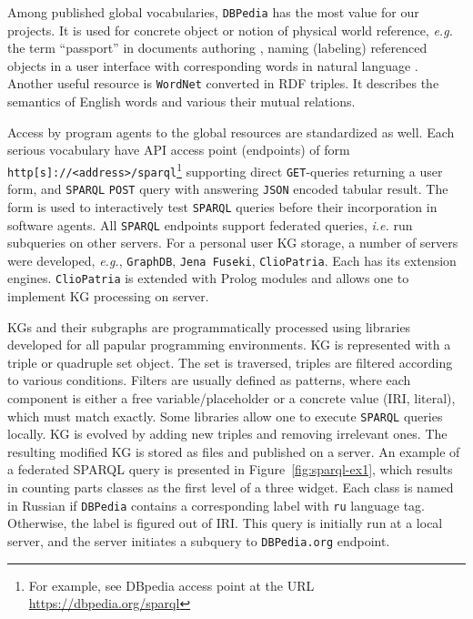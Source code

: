 \documentclass[
]{ceurart}
\begin{document}
Among published global vocabularies, \texttt{DBPedia} has the most value for our projects. It is used for concrete object or notion of physical world reference, \emph{e.g.} the term ``passport'' in documents authoring \cite{}, naming (labeling) referenced objects in a user interface with corresponding words in natural language \cite{github-db}. Another useful resource is \texttt{WordNet} converted in RDF triples.  It describes the semantics of English words and various their mutual relations.

Access by program agents to the global resources are standardized as well.  Each serious vocabulary have API access point (endpoints) of form
\verb|http[s]://<address>/sparql|\footnote{For example, see DBpedia access point at the URL \url{https://dbpedia.org/sparql}} supporting direct \texttt{GET}-queries returning a user form, and \texttt{SPARQL} \texttt{POST} query with answering \texttt{JSON} encoded tabular result.  The form is used to interactively test \texttt{SPARQL} queries before their incorporation in software agents.  All \texttt{SPARQL} endpoints support federated queries, \emph{i.e.} run subqueries on other servers.   For a personal user KG storage, a number of servers were developed, \emph{e.g.}, \texttt{GraphDB}, \texttt{Jena Fuseki}, \texttt{ClioPatria}.  Each has its extension engines.  \texttt{ClioPatria} is extended with Prolog modules and allows one to implement KG processing on server.

KGs and their subgraphs are programmatically processed using libraries developed for all papular programming environments. KG is represented with a triple or quadruple set object. The set is traversed, triples are filtered according to various conditions. Filters are usually defined as patterns, where each component is either a free variable/placeholder or a concrete value (IRI, literal), which must match exactly.   Some libraries allow one to execute \texttt{SPARQL} queries locally. KG is evolved by adding new triples and removing irrelevant ones. The resulting modified KG is stored as files and published on a server. An example of a federated SPARQL query is presented in Figure~\ref{fig:sparql-ex1}, which results in counting parts classes as the first level of a three widget. Each class is named in Russian if \texttt{DBPedia} contains a corresponding label with \texttt{ru} language tag.  Otherwise, the label is figured out of IRI. This query is initially run at a local server, and the server initiates a subquery to \texttt{DBPedia.org} endpoint.
\end{document}
